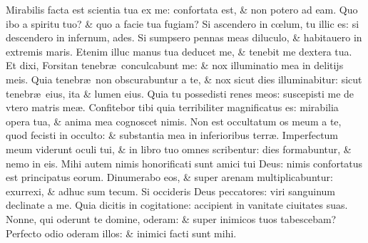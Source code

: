 \documentclass[a5paper,10pt]{book}
\def\ae{æ}
\def\oe{œ}
\begin{document}
\begin{multicols*}{2}
\newline \color{red} M\color{black}irabilis facta est scientia tua ex me: confortata est, \& non potero ad eam.
\newline \color{red} Q\color{black}uo ibo a spiritu tuo? \& quo a facie tua fugiam?
\newline \color{red} S\color{black}i ascendero in c\oe lum, tu illic es: si descendero in infernum, ades.
\newline \color{red} S\color{black}i sumpsero pennas meas diluculo, \& habitauero in extremis maris.
\newline \color{red} E\color{black}tenim illuc manus tua deducet me, \& tenebit me dextera tua.
\newline \color{red} E\color{black}t dixi, Forsitan tenebr\ae \ conculcabunt me: \& nox illuminatio mea in delitijs meis.%
\newline \color{red} Q\color{black}uia tenebr\ae \ non obscurabuntur a te, \& nox sicut dies illuminabitur: sicut tenebr\ae \ eius, ita \& lumen eius.
\newline \color{red} Q\color{black}uia tu possedisti renes meos: suscepisti me de vtero matris me\ae .
\newline \color{red} C\color{black}onfitebor tibi quia terribiliter magnificatus es: mirabilia opera tua, \& anima mea cognoscet nimis.%
\newline \color{red} N\color{black}on est occultatum os meum a te, quod fecisti in occulto: \& substantia mea in inferioribus terr\ae .
\newline \color{red} I\color{black}mperfectum meum viderunt oculi tui, \& in libro tuo omnes scribentur: dies formabuntur, \& nemo in eis.
\newline \color{red} M\color{black}ihi autem nimis honorificati sunt amici tui Deus: nimis confortatus est principatus eorum.
\newline \color{red} D\color{black}inumerabo eos, \& super arenam multiplicabuntur: exurrexi, \& adhuc sum tecum.
\newline \color{red} S\color{black}i occideris Deus peccatores: viri sanguinum declinate a me.
\newline \color{red} Q\color{black}uia dicitis in cogitatione: accipient in vanitate ciuitates suas.%
\newline \color{red} N\color{black}onne, qui oderunt te domine, oderam: \& super inimicos tuos tabescebam?
\newline \color{red} P\color{black}erfecto odio oderam illos: \& inimici facti sunt mihi.

\end{multicols*}
\end{document}
